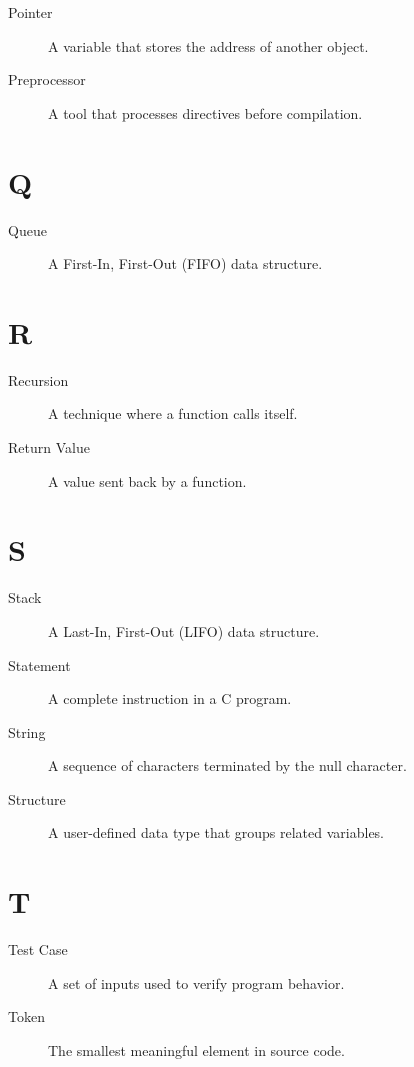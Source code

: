 \documentclass[12pt,openany]{book}
\begin{document}
\begin{description}
    \item[Pointer] A variable that stores the address of another object.
    \item[Preprocessor] A tool that processes directives before compilation.
\end{description}

\section*{Q}

\begin{description}
    \item[Queue] A First-In, First-Out (FIFO) data structure.
\end{description}

\section*{R}

\begin{description}
    \item[Recursion] A technique where a function calls itself.
    \item[Return Value] A value sent back by a function.
\end{description}

\section*{S}

\begin{description}
    \item[Stack] A Last-In, First-Out (LIFO) data structure.
    \item[Statement] A complete instruction in a C program.
    \item[String] A sequence of characters terminated by the null character.
    \item[Structure] A user-defined data type that groups related variables.
\end{description}

\section*{T}

\begin{description}
    \item[Test Case] A set of inputs used to verify program behavior.
    \item[Token] The smallest meaningful element in source code.
\end{description}
\end{document}
